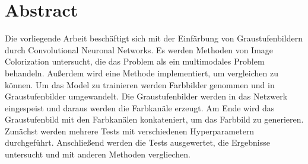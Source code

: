 \chapter*{Abstract}
Die vorliegende Arbeit beschäftigt sich mit der Einfärbung von Graustufenbildern durch Convolutional Neuronal Networks.
Es werden Methoden von Image Colorization untersucht, die das Problem als ein multimodales Problem behandeln. Außerdem wird
eine Methode implementiert, um vergleichen zu können. Um das Model zu trainieren werden Farbbilder genommen und in Graustufenbilder umgewandelt. 
Die Graustufenbilder werden in das Netzwerk eingespeist und daraus werden die
Farbkanäle erzeugt. Am Ende wird das Graustufenbild mit den Farbkanälen konkateniert, um das Farbbild zu generieren.
\\
Zunächst werden mehrere Tests mit verschiedenen Hyperparametern durchgeführt.
Anschließend werden die Tests ausgewertet, die Ergebnisse untersucht und mit anderen Methoden vergliechen.